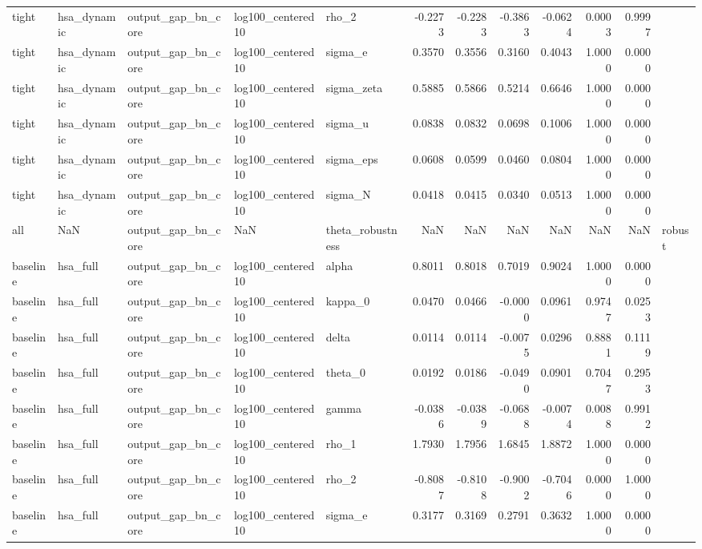 \begin{tabular}{lllllrrrrrrl}
tight & hsa\_dynamic & output\_gap\_bn\_core & log100\_centered10 & rho\_2 & -0.2273 & -0.2283 & -0.3863 & -0.0624 & 0.0003 & 0.9997 &  \\
tight & hsa\_dynamic & output\_gap\_bn\_core & log100\_centered10 & sigma\_e & 0.3570 & 0.3556 & 0.3160 & 0.4043 & 1.0000 & 0.0000 &  \\
tight & hsa\_dynamic & output\_gap\_bn\_core & log100\_centered10 & sigma\_zeta & 0.5885 & 0.5866 & 0.5214 & 0.6646 & 1.0000 & 0.0000 &  \\
tight & hsa\_dynamic & output\_gap\_bn\_core & log100\_centered10 & sigma\_u & 0.0838 & 0.0832 & 0.0698 & 0.1006 & 1.0000 & 0.0000 &  \\
tight & hsa\_dynamic & output\_gap\_bn\_core & log100\_centered10 & sigma\_eps & 0.0608 & 0.0599 & 0.0460 & 0.0804 & 1.0000 & 0.0000 &  \\
tight & hsa\_dynamic & output\_gap\_bn\_core & log100\_centered10 & sigma\_N & 0.0418 & 0.0415 & 0.0340 & 0.0513 & 1.0000 & 0.0000 &  \\
all & NaN & output\_gap\_bn\_core & NaN & theta\_robustness & NaN & NaN & NaN & NaN & NaN & NaN & robust \\
baseline & hsa\_full & output\_gap\_bn\_core & log100\_centered10 & alpha & 0.8011 & 0.8018 & 0.7019 & 0.9024 & 1.0000 & 0.0000 &  \\
baseline & hsa\_full & output\_gap\_bn\_core & log100\_centered10 & kappa\_0 & 0.0470 & 0.0466 & -0.0000 & 0.0961 & 0.9747 & 0.0253 &  \\
baseline & hsa\_full & output\_gap\_bn\_core & log100\_centered10 & delta & 0.0114 & 0.0114 & -0.0075 & 0.0296 & 0.8881 & 0.1119 &  \\
baseline & hsa\_full & output\_gap\_bn\_core & log100\_centered10 & theta\_0 & 0.0192 & 0.0186 & -0.0490 & 0.0901 & 0.7047 & 0.2953 &  \\
baseline & hsa\_full & output\_gap\_bn\_core & log100\_centered10 & gamma & -0.0386 & -0.0389 & -0.0688 & -0.0074 & 0.0088 & 0.9912 &  \\
baseline & hsa\_full & output\_gap\_bn\_core & log100\_centered10 & rho\_1 & 1.7930 & 1.7956 & 1.6845 & 1.8872 & 1.0000 & 0.0000 &  \\
baseline & hsa\_full & output\_gap\_bn\_core & log100\_centered10 & rho\_2 & -0.8087 & -0.8108 & -0.9002 & -0.7046 & 0.0000 & 1.0000 &  \\
baseline & hsa\_full & output\_gap\_bn\_core & log100\_centered10 & sigma\_e & 0.3177 & 0.3169 & 0.2791 & 0.3632 & 1.0000 & 0.0000 &  \\

\end{tabular}
